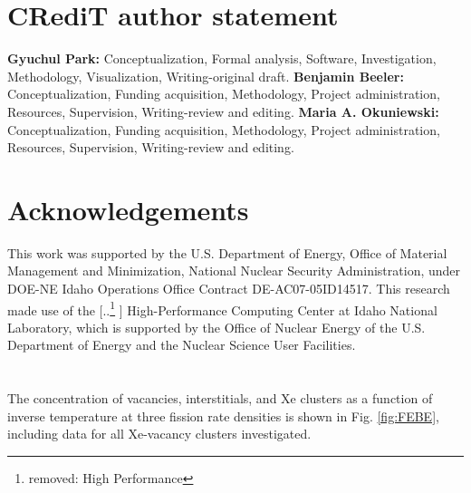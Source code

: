 \documentclass[preprint,12pt]{elsarticle}
\providecommand{\DIFadd}[1]{{\protect\color{blue} \sf #1}} %
\providecommand{\DIFdel}[1]{{\protect\color{red} [..\footnote{removed: #1} ]}} %
\providecommand{\DIFaddbegin}{} %
\providecommand{\DIFaddend}{} %
\providecommand{\DIFdelbegin}{} %
\providecommand{\DIFdelend}{} %
\newcommand{\DIFscaledelfig}{0.5}
\newlength{\DIFdelgraphicswidth} %
\newlength{\DIFdelgraphicsheight} %
\newcommand{\DIFaddincludegraphics}[2][]{{\color{blue}\fbox{\DIFOincludegraphics[#1]{#2}}}} %
\newcommand{\DIFdelincludegraphics}[2][]{%
\sbox{\DIFdelgraphicsbox}{\DIFOincludegraphics[#1]{#2}}%
\settoboxwidth{\DIFdelgraphicswidth}{\DIFdelgraphicsbox} %
\settoboxtotalheight{\DIFdelgraphicsheight}{\DIFdelgraphicsbox} %
\scalebox{\DIFscaledelfig}{%
\parbox[b]{\DIFdelgraphicswidth}{\usebox{\DIFdelgraphicsbox}\\[-\baselineskip] \rule{\DIFdelgraphicswidth}{0em}}\llap{\resizebox{\DIFdelgraphicswidth}{\DIFdelgraphicsheight}{%
\setlength{\unitlength}{\DIFdelgraphicswidth}%
\begin{picture}(1,1)%
\thicklines\linethickness{2pt} %
{\color[rgb]{1,0,0}\put(0,0){\framebox(1,1){}}}%
{\color[rgb]{1,0,0}\put(0,0){\line( 1,1){1}}}%
{\color[rgb]{1,0,0}\put(0,1){\line(1,-1){1}}}%
\end{picture}%
}\hspace*{3pt}}} %
} %
\DeclareRobustCommand{\DIFaddbegin}{\DIFOaddbegin \let\includegraphics\DIFaddincludegraphics} %
\DeclareRobustCommand{\DIFaddend}{\DIFOaddend \let\includegraphics\DIFOincludegraphics} %
\DeclareRobustCommand{\DIFdelbegin}{\DIFOdelbegin \let\includegraphics\DIFdelincludegraphics} %
\DeclareRobustCommand{\DIFdelend}{\DIFOaddend \let\includegraphics\DIFOincludegraphics} %
\begin{document}
\section{CRediT author statement}
\textbf{Gyuchul Park:} Conceptualization, Formal analysis, Software, Investigation, Methodology, Visualization, Writing-original draft. \textbf{Benjamin Beeler:} Conceptualization, Funding acquisition, Methodology,  Project administration, Resources, Supervision, Writing-review and editing. \textbf{Maria A. Okuniewski:} Conceptualization, Funding acquisition, Methodology, Project administration, Resources, Supervision, Writing-review and editing.

\section{Acknowledgements}
This work was supported by the U.S. Department of Energy, Office of Material Management and Minimization, National Nuclear Security Administration, under DOE-NE Idaho Operations Office Contract DE-AC07-05ID14517. This research made use of the \DIFdelbegin \DIFdel{High Performance }\DIFdelend \DIFaddbegin \DIFadd{High-Performance }\DIFaddend Computing Center at Idaho National Laboratory, which is supported by the Office of Nuclear Energy of the U.S. Department of Energy and the Nuclear Science User Facilities. 

\DIFaddbegin \clearpage
\DIFaddend \appendix
\section{}

\setcounter{figure}{0}

The concentration of vacancies, interstitials, and Xe clusters as a function of inverse temperature at three fission rate densities is shown in Fig. \ref{fig:FEBE}, including data for all Xe-vacancy clusters investigated.
\end{document}
